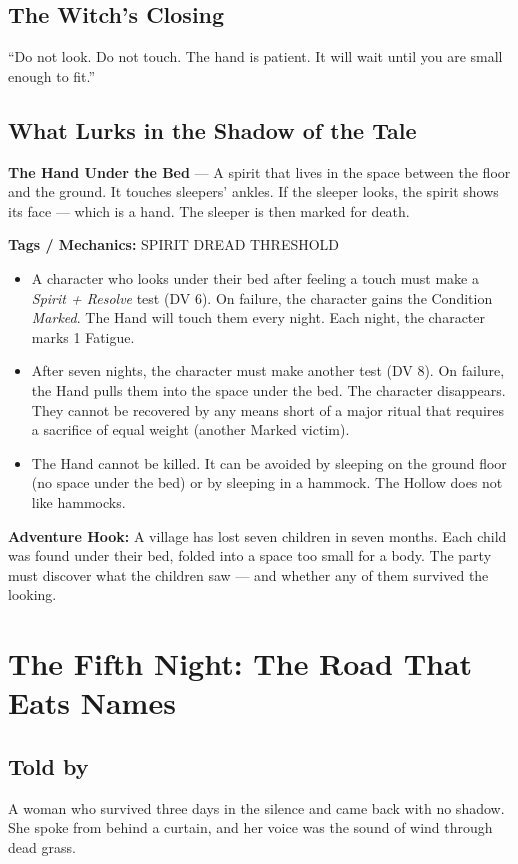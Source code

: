 \documentclass[10pt,twoside]{book}
\newcommand{\tag}[1]{\textsc{#1}}
\begin{document}
\section*{The Witch's Closing}
``Do not look. Do not touch. The hand is patient. It will wait until you are small enough to fit.''

\section*{What Lurks in the Shadow of the Tale}
\begin{infobox}
\textbf{The Hand Under the Bed} --- A spirit that lives in the space between the floor and the ground. It touches sleepers' ankles. If the sleeper looks, the spirit shows its face --- which is a hand. The sleeper is then marked for death.

\textbf{Tags / Mechanics:} \tag{SPIRIT} \tag{DREAD} \tag{THRESHOLD}

\begin{itemize}
\item A character who looks under their bed after feeling a touch must make a \textit{Spirit + Resolve} test (DV 6). On failure, the character gains the Condition \textit{Marked}. The Hand will touch them every night. Each night, the character marks 1 Fatigue.
\item After seven nights, the character must make another test (DV 8). On failure, the Hand pulls them into the space under the bed. The character disappears. They cannot be recovered by any means short of a major ritual that requires a sacrifice of equal weight (another Marked victim).
\item The Hand cannot be killed. It can be avoided by sleeping on the ground floor (no space under the bed) or by sleeping in a hammock. The Hollow does not like hammocks.
\end{itemize}

\textbf{Adventure Hook:} A village has lost seven children in seven months. Each child was found under their bed, folded into a space too small for a body. The party must discover what the children saw --- and whether any of them survived the looking.
\end{infobox}

\chapter{The Fifth Night: The Road That Eats Names}

\section*{Told by}
A woman who survived three days in the silence and came back with no shadow. She spoke from behind a curtain, and her voice was the sound of wind through dead grass.
\end{document}

